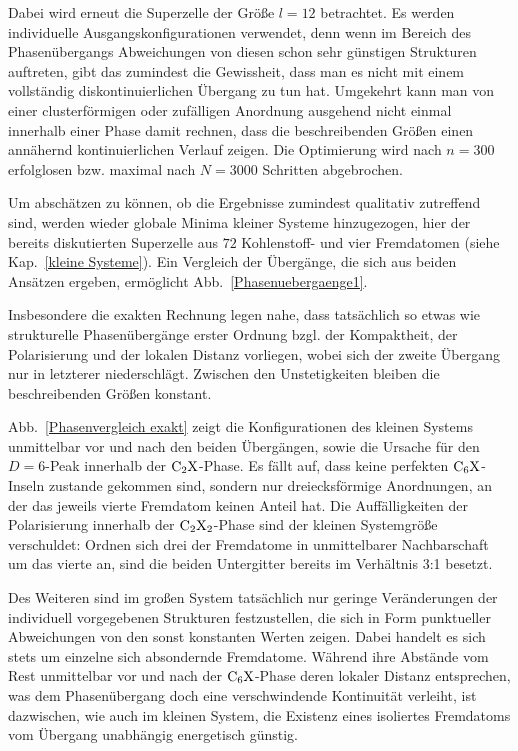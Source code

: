 \documentclass[a4paper, 10pt, twoside, openany]{book} %
\begin{document}
Dabei wird erneut die Superzelle der Größe $l = 12$ betrachtet. Es werden individuelle Ausgangskonfigurationen verwendet, denn wenn im Bereich des Phasenübergangs Abweichungen von diesen schon sehr günstigen Strukturen auftreten, gibt das zumindest die Gewissheit, dass man es nicht mit einem vollständig diskontinuierlichen Übergang zu tun hat. Umgekehrt kann man von einer clusterförmigen oder zufälligen Anordnung ausgehend nicht einmal innerhalb einer Phase damit rechnen, dass die beschreibenden Größen einen annähernd kontinuierlichen Verlauf zeigen. Die Optimierung wird nach $n = 300$ erfolglosen bzw. maximal nach $N = 3000$ Schritten abgebrochen.

Um abschätzen zu können, ob die Ergebnisse zumindest qualitativ zutreffend sind, werden wieder globale Minima kleiner Systeme hinzugezogen, hier der bereits diskutierten Superzelle aus $72$ Kohlenstoff- und vier Fremdatomen (siehe Kap.~\ref{kleine Systeme}). Ein Vergleich der Übergänge, die sich aus beiden Ansätzen ergeben, ermöglicht Abb.~\ref{Phasenuebergaenge1}.

Insbesondere die exakten Rechnung legen nahe, dass tatsächlich so etwas wie strukturelle Phasenübergänge erster Ordnung bzgl. der Kompaktheit, der Polarisierung und der lokalen Distanz vorliegen, wobei sich der zweite Übergang nur in letzterer niederschlägt. Zwischen den Unstetigkeiten bleiben die beschreibenden Größen konstant.

Abb.~\ref{Phasenvergleich exakt} zeigt die Konfigurationen des kleinen Systems unmittelbar vor und nach den beiden Übergängen, sowie die Ursache für den $D = 6$-Peak innerhalb der $\rm C_2X$-Phase. Es fällt auf, dass keine perfekten $\rm C_6X$-Inseln zustande gekommen sind, sondern nur dreiecksförmige Anordnungen, an der das jeweils vierte Fremdatom keinen Anteil hat. Die Auffälligkeiten der Polarisierung innerhalb der $\rm C_2X_2$-Phase sind der kleinen Systemgröße verschuldet: Ordnen sich drei der Fremdatome in unmittelbarer Nachbarschaft um das vierte an, sind die beiden Untergitter bereits im Verhältnis 3:1 besetzt.

Des Weiteren sind im großen System tatsächlich nur geringe Veränderungen der individuell vorgegebenen Strukturen festzustellen, die sich in Form punktueller Abweichungen von den sonst konstanten Werten zeigen. Dabei handelt es sich stets um einzelne sich absondernde Fremdatome. Während ihre Abstände vom Rest unmittelbar vor und nach der $\rm C_6X$-Phase deren lokaler Distanz entsprechen, was dem Phasenübergang doch eine verschwindende Kontinuität verleiht, ist dazwischen, wie auch im kleinen System, die Existenz eines isoliertes Fremdatoms vom Übergang unabhängig energetisch günstig.
\end{document}

